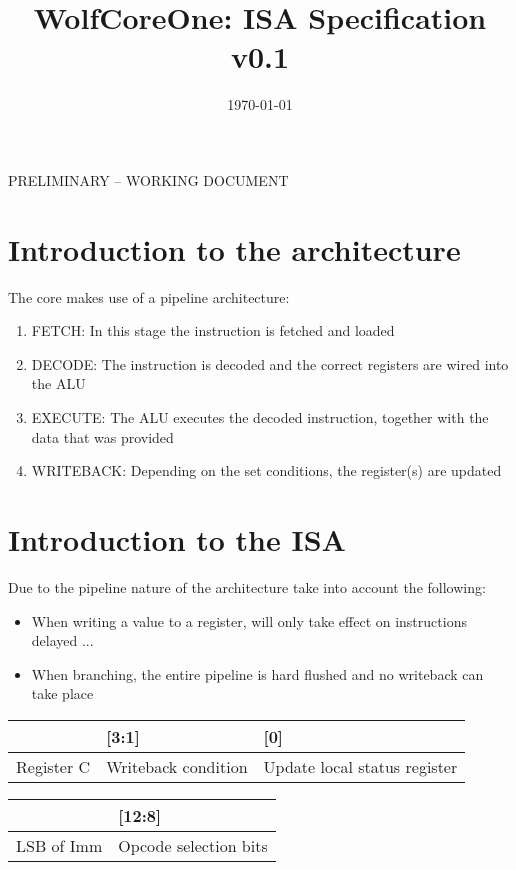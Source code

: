 \documentclass[a4paper,11pt]{article}
\begin{document}
\title{WolfCoreOne: ISA Specification v0.1}
\author{}
\date{\today}
\maketitle
PRELIMINARY -- WORKING DOCUMENT
\section{Introduction to the architecture}
The core makes use of a pipeline architecture:
\begin{enumerate}
    \item FETCH: In this stage the instruction is fetched and loaded
    \item DECODE: The instruction is decoded and the correct registers are wired into the ALU
    \item EXECUTE: The ALU executes the decoded instruction, together with the data that was provided
    \item WRITEBACK: Depending on the set conditions, the register(s) are updated
\end{enumerate}

\section{Introduction to the ISA}
Due to the pipeline nature of the architecture take into account the following:
\begin{itemize}
    \item When writing a value to a register, will only take effect on instructions delayed ... 
    \item When branching, the entire pipeline is hard flushed and no writeback can take place
\end{itemize}

\begin{table}
	\begin{center}
	\begin{tabular}{|C{8cm}|C{6cm}|C{2cm}|}
		\hline
		[7:4] & [3:1] & [0] \\ \hline 
		Register C & Writeback condition & Update local status register \\ \hline \hline
	\end{tabular}
	\begin{tabular}{|C{6cm}|C{2cm}|}
		\hline
		[15:13] & [12:8] \\ \hline
		LSB of Imm & Opcode selection bits \\ \hline \hline
	\end{tabular}
	\end{center}
\end{table}
\end{document}
